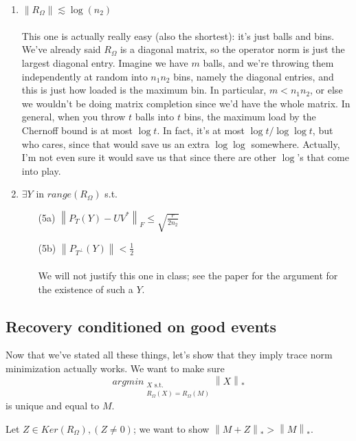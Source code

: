 \documentclass[11pt]{article}
\newcommand{\norm}[1]{\left\| #1 \right\|}
\begin{document}
\begin{enumerate}
\item $\norm{R_\Omega} \lesssim \log(n_2)$ \\ \\ This one is actually really easy (also the shortest): it's just balls and bins. We've already said $R_\Omega$ is a diagonal matrix, so the operator norm is just the largest diagonal entry. Imagine we have $m$ balls, and we're throwing them independently at random into $n_1 n_2$ bins, namely the diagonal entries, and this is just how loaded is the maximum bin. In particular, $m < n_1 n_2$, or else we wouldn't be doing matrix completion since we'd have the whole matrix. In general, when you throw $t$ balls into $t$ bins, the maximum load by the Chernoff bound is at most $\log t$. In fact, it's at most $\log t / \log \log t$, but who cares, since that would save us an extra $\log \log$ somewhere. Actually, I'm not even sure it would save us that since there are other $\log$'s that come into play.
\item $\exists Y$ in $range(R_\Omega)$ s.t.
\begin{enumerate}
\item[(5a)] $\norm{P_T(Y) - UV^*}_F \le \sqrt{ \frac{r}{2n_2} }$
\item[(5b)] $\norm{P_{T^\perp} (Y)} < \frac{1}{2}$ \\ \\ We will not justify this one in class; see the paper for the argument for the existence of such a $Y$.
\end{enumerate}
\end{enumerate}

\subsection{Recovery conditioned on good events}
Now that we've stated all these things, let's show that they imply trace norm minimization actually works.
We want to make sure 
\[ argmin_{\substack{X \text{ s.t.} \\ R_\Omega (X) = R_\Omega (M) }} \norm{X}_* \] is unique and equal to $M$.

Let $Z \in Ker(R_\Omega), (Z \ne 0)$; we want to show $\norm{M + Z}_* > \norm{M}_*$.
\end{document}
